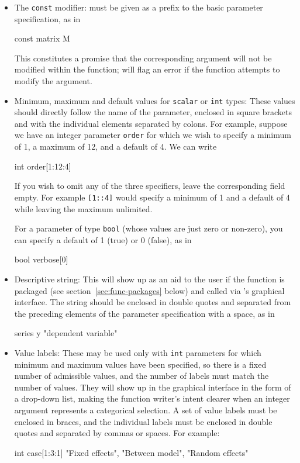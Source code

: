 \begin{itemize}

\item The \texttt{const} modifier: must be given as a prefix to the
  basic parameter specification, as in
%    
\begin{code}
const matrix M
\end{code} 
%
This constitutes a promise that the corresponding argument will not be
modified within the function;  will flag an error if
the function attempts to modify the argument.

\item Minimum, maximum and default values for \texttt{scalar} or
  \texttt{int} types: These values should directly follow the name of
  the parameter, enclosed in square brackets and with the individual
  elements separated by colons.  For example, suppose we have an
  integer parameter \texttt{order} for which we wish to specify a
  minimum of 1, a maximum of 12, and a default of 4.  We can write
%    
\begin{code}
int order[1:12:4]
\end{code} 
%
If you wish to omit any of the three specifiers, leave the
corresponding field empty.  For example \texttt{[1::4]} would specify
a minimum of 1 and a default of 4 while leaving the maximum
unlimited.  

For a parameter of type \texttt{bool} (whose values are just zero or
non-zero), you can specify a default of 1 (true) or 0 (false), as in
%    
\begin{code}
bool verbose[0]
\end{code} 

\item Descriptive string: This will show up as an aid to the user if
  the function is packaged (see section~\ref{sec:func-packages} below)
  and called via 's graphical interface.  The string should
  be enclosed in double quotes and separated from the preceding
  elements of the parameter specification with a space, as in
%
\begin{code}
series y "dependent variable"
\end{code} 

\item Value labels: These may be used only with \texttt{int}
  parameters for which minimum and maximum values have been specified,
  so there is a fixed number of admissible values, and the number of
  labels must match the number of values. They will show up in the
  graphical interface in the form of a drop-down list, making the
  function writer's intent clearer when an integer argument represents
  a categorical selection. A set of value labels must be enclosed in
  braces, and the individual labels must be enclosed in double quotes
  and separated by commas or spaces.  For example:
%
\begin{code}
int case[1:3:1] {"Fixed effects", "Between model", "Random effects"}
\end{code} 

\end{itemize}

